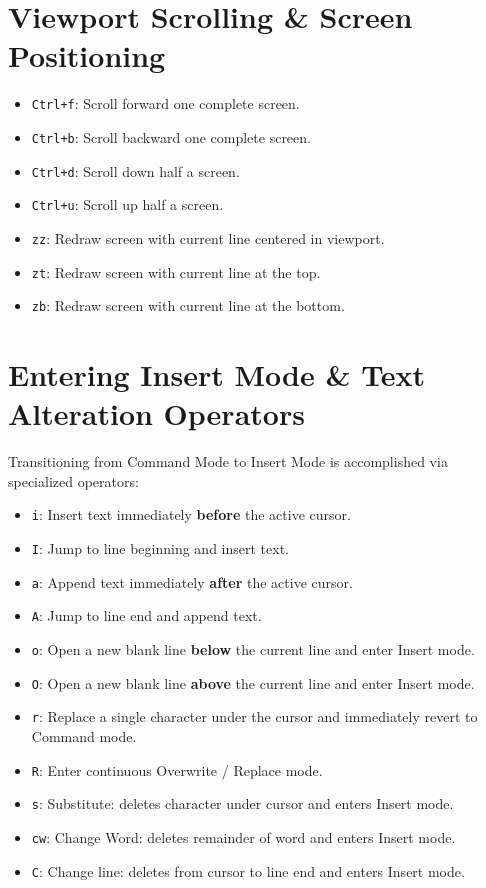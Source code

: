 \section{Viewport Scrolling \& Screen Positioning}
\begin{itemize}[leftmargin=1.5em]
    \item \texttt{Ctrl+f}: Scroll forward one complete screen.
    \item \texttt{Ctrl+b}: Scroll backward one complete screen.
    \item \texttt{Ctrl+d}: Scroll down half a screen.
    \item \texttt{Ctrl+u}: Scroll up half a screen.
    \item \texttt{zz}: Redraw screen with current line centered in viewport.
    \item \texttt{zt}: Redraw screen with current line at the top.
    \item \texttt{zb}: Redraw screen with current line at the bottom.
\end{itemize}

\section{Entering Insert Mode \& Text Alteration Operators}
Transitioning from Command Mode to Insert Mode is accomplished via specialized operators:
\begin{itemize}[leftmargin=1.5em]
    \item \texttt{i}: Insert text immediately \textbf{before} the active cursor.
    \item \texttt{I}: Jump to line beginning and insert text.
    \item \texttt{a}: Append text immediately \textbf{after} the active cursor.
    \item \texttt{A}: Jump to line end and append text.
    \item \texttt{o}: Open a new blank line \textbf{below} the current line and enter Insert mode.
    \item \texttt{O}: Open a new blank line \textbf{above} the current line and enter Insert mode.
    \item \texttt{r}: Replace a single character under the cursor and immediately revert to Command mode.
    \item \texttt{R}: Enter continuous Overwrite / Replace mode.
    \item \texttt{s}: Substitute: deletes character under cursor and enters Insert mode.
    \item \texttt{cw}: Change Word: deletes remainder of word and enters Insert mode.
    \item \texttt{C}: Change line: deletes from cursor to line end and enters Insert mode.
\end{itemize}


